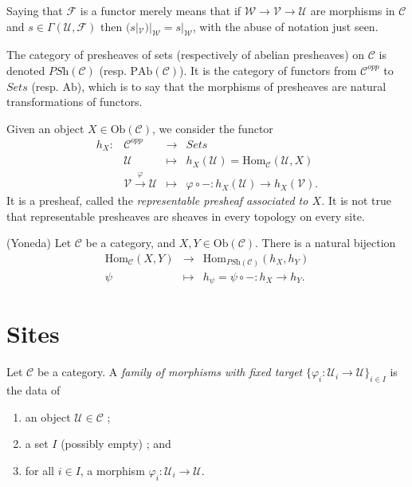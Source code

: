 \medskip\noindent
Saying that $\mathcal{F}$ is a functor merely means that if $\mathcal{W} \to
\mathcal{V} \to \mathcal{U}$ are morphisms in $\mathcal{C}$ and $s \in
\Gamma(\mathcal{U},\mathcal{F})$ then
$(s|_\mathcal{V})|_\mathcal{W} = s |_\mathcal{W}$, with the abuse of
notation just seen.

\medskip\noindent
The category of presheaves of sets (respectively of abelian presheaves) on
$\mathcal{C}$ is denoted $\textit{PSh} (\mathcal{C})$ (resp. $\text{PAb}
(\mathcal{C})$). It is the category of functors from $\mathcal{C}^{opp}$ to
$\textit{Sets}$ (resp. $\text{Ab}$), which is to say that the morphisms of
presheaves are natural transformations of functors.

\begin{example}
\label{example-representable-presheaf}
Given an object $X \in \text{Ob}(\mathcal{C})$, we consider the functor
$$
\begin{matrix}
h_X : & \mathcal{C}^{opp} & \to & \textit{Sets} \\
& \mathcal{U} & \mapsto & h_X(\mathcal{U}) = \text{Hom}_\mathcal{C}
(\mathcal{U},X) \\
& \mathcal{V}\xrightarrow{\varphi} \mathcal{U} & \mapsto &
\varphi \circ - :
h_X(\mathcal{U})
\to
h_X(\mathcal{V}).
\end{matrix}
$$
It is a presheaf, called the {\it representable presheaf associated to $X$.}
It is not true that representable presheaves are sheaves in every topology on
every site.
\end{example}

\begin{lemma}
\label{lemma-yoneda}
(Yoneda)
Let $\mathcal{C}$ be a category, and $X,Y \in
\text{Ob}(\mathcal{C})$. There is a natural bijection
$$
\begin{matrix}
\text{Hom}_\mathcal{C}(X,Y) &
\longrightarrow &
\text{Hom}_{\textit{PSh}(\mathcal{C})} (h_X,h_Y) \\
\psi &
\longmapsto &
h_\psi = \psi \circ - : h_X \to h_Y.
\end{matrix}
$$
\end{lemma}





\section{Sites}
\label{section-sites}

\begin{definition}
\label{definition-family-morphisms-fixed-target}
Let $\mathcal{C}$ be a category. A {\it family of morphisms with fixed target}
$\{\varphi_i : \mathcal{U}_i \to \mathcal{U} \}_{i\in I}$ is the data of
\begin{enumerate}
\item an object $\mathcal{U} \in \mathcal{C}$ ;
\item a set $I$ (possibly empty) ; and
\item for all $i\in I$, a morphism $\varphi_i : \mathcal{U}_i \to \mathcal{U}$.
\end{enumerate}
\end{definition}

